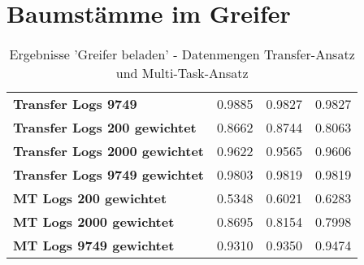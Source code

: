 \chapter{Baumstämme im Greifer}
\label{appendix:BaumstammImGreifer}

	\begin{table}[ht]
	\centering
	\begin{tabularx}{\textwidth}{llll}
	\rowcolor{Gray}	\textbf{Transfer Logs 9749} 			& 0.9885 & 0.9827 & 0.9827	\\ 
		\textbf{Transfer Logs 200 gewichtet}	& 0.8662 & 0.8744 & 0.8063 	\\		
		\textbf{Transfer Logs 2000 gewichtet}	& 0.9622 & 0.9565 & 0.9606  \\	
		\textbf{Transfer Logs 9749 gewichtet}	& 0.9803 & 0.9819 & 0.9819	\\	
		\textbf{MT Logs 200 gewichtet}	 	    & 0.5348 & 0.6021 & 0.6283 	\\		
		\textbf{MT Logs 2000 gewichtet}	 	    & 0.8695 & 0.8154 & 0.7998 	\\	
		\textbf{MT Logs 9749 gewichtet}	 	    & 0.9310 & 0.9350 & 0.9474  \\	
	\end{tabularx}
	\caption{Ergebnisse 'Greifer beladen' - Datenmengen Transfer-Ansatz und Multi-Task-Ansatz}
	\label{table:Ergebnisse_Transfer_Logs}
\end{table}